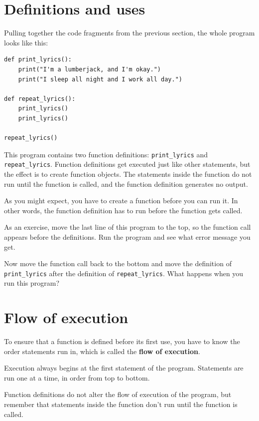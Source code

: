 \documentclass[10pt]{book}
\begin{document}
\section{Definitions and uses}

Pulling together the code fragments from the previous section, the
whole program looks like this:

\begin{verbatim}
def print_lyrics():
    print("I'm a lumberjack, and I'm okay.")
    print("I sleep all night and I work all day.")

def repeat_lyrics():
    print_lyrics()
    print_lyrics()

repeat_lyrics()
\end{verbatim}
%
This program contains two function definitions: \verb"print_lyrics" and
\verb"repeat_lyrics".  Function definitions get executed just like other
statements, but the effect is to create function objects.  The statements
inside the function do not run until the function is called, and
the function definition generates no output.

As you might expect, you have to create a function before you can
run it.  In other words, the function definition has to run
before the function gets called.

As an exercise, move the last line of this program
to the top, so the function call appears before the definitions. Run 
the program and see what error
message you get.

Now move the function call back to the bottom
and move the definition of \verb"print_lyrics" after the definition of
\verb"repeat_lyrics".  What happens when you run this program?


\section{Flow of execution}

To ensure that a function is defined before its first use,
you have to know the order statements run in, which is
called the {\bf flow of execution}.

Execution always begins at the first statement of the program.
Statements are run one at a time, in order from top to bottom.

Function definitions do not alter the flow of execution of the
program, but remember that statements inside the function don't
run until the function is called.
\end{document}
